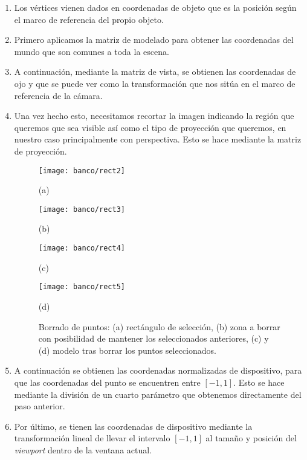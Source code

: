 \begin{enumerate}
\item Los vértices vienen dados en coordenadas de objeto que es la posición según el marco de referencia del propio objeto.
\item Primero aplicamos la matriz de modelado para obtener las coordenadas del mundo que son comunes a toda la escena. 
\item A continuación, mediante la matriz de vista, se obtienen las coordenadas de ojo y que se puede ver como la transformación que nos sitúa en el marco de referencia de la cámara.
\item Una vez hecho esto, necesitamos recortar la imagen indicando la región que queremos que sea visible así como el tipo de proyección que queremos, en nuestro caso principalmente con perspectiva. Esto se hace mediante la matriz de proyección.

\begin{figure}[h!]
	\begin{minipage}{0.5\textwidth}
		\centering
		\texttt{[image: banco/rect2]} 
		\caption*{(a)}
	\end{minipage}
	\begin{minipage}{0.5\textwidth}
		\centering
		\texttt{[image: banco/rect3]} 
		\caption*{(b)}
	\end{minipage}
	\begin{minipage}{0.5\textwidth}
		\centering
		\texttt{[image: banco/rect4]} 
		\caption*{(c)}
	\end{minipage}
	\begin{minipage}{0.5\textwidth}
		\centering
		\texttt{[image: banco/rect5]} 
		\caption*{(d)}
	\end{minipage}
	\caption{Borrado de puntos: (a) rectángulo de selección, (b) zona a borrar con posibilidad de mantener los seleccionados anteriores, (c) y (d) modelo tras borrar los puntos seleccionados.}
	\label{fig:delRect}
\end{figure}

\item A continuación se obtienen las coordenadas normalizadas de dispositivo, para que las coordenadas del punto se encuentren entre $ \left[-1,1\right] $. Esto se hace mediante la división de un cuarto parámetro que obtenemos directamente del paso anterior.
\item Por último, se tienen las coordenadas de dispositivo mediante la transformación lineal de llevar el intervalo $ \left[-1,1\right] $ al tamaño y posición del \textit{viewport} dentro de la ventana actual.

\end{enumerate}

